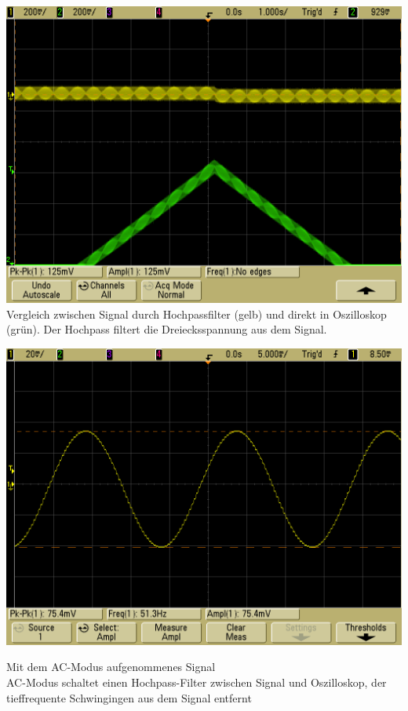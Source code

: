 \documentclass[compress,11pt]{beamer}
\begin{document}
\begin{frame}
\includegraphics[width=.9\textwidth]{../daten/scope_21}
Vergleich zwischen Signal durch Hochpassfilter (gelb) und direkt in Oszilloskop (grün). Der Hochpass filtert die Dreiecksspannung aus dem Signal.
\end{frame}
\begin{frame}
\includegraphics[width=.9\textwidth]{../daten/scope_22}
\end{frame}

\begin{frame}
Mit dem AC-Modus aufgenommenes Signal\\
AC-Modus schaltet einen Hochpass-Filter zwischen Signal und Oszilloskop, der tieffrequente Schwingingen aus dem Signal entfernt
\end{frame}
\end{document}
